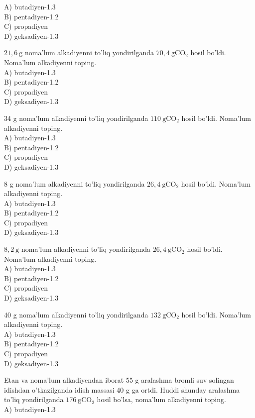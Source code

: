A) butadiyen-1.3\\
B) pentadiyen-1.2\\
C) propadiyen\\
D) geksadiyen-1.3
  \item $21,6 \mathrm{~g}$ noma'lum alkadiyenni to'liq yondirilganda $70,4 \mathrm{~g} \mathrm{CO}_{2}$ hosil bo'ldi. Noma'lum alkadiyenni toping.\\
A) butadiyen-1.3\\
B) pentadiyen-1.2\\
C) propadiyen\\
D) geksadiyen-1.3
  \item 34 g noma'lum alkadiyenni to'liq yondirilganda $110 \mathrm{~g} \mathrm{CO}_{2}$ hosil bo'ldi. Noma'lum alkadiyenni toping.\\
A) butadiyen-1.3\\
B) pentadiyen-1.2\\
C) propadiyen\\
D) geksadiyen-1.3
  \item 8 g noma'lum alkadiyenni to'liq yondirilganda $26,4 \mathrm{~g} \mathrm{CO}_{2}$ hosil bo'ldi. Noma'lum alkadiyenni toping.\\
A) butadiyen-1.3\\
B) pentadiyen-1.2\\
C) propadiyen\\
D) geksadiyen-1.3
  \item $8,2 \mathrm{~g}$ noma'lum alkadiyenni to'liq yondirilganda $26,4 \mathrm{~g} \mathrm{CO}_{2}$ hosil bo'ldi. Noma'lum alkadiyenni toping.\\
A) butadiyen-1.3\\
B) pentadiyen-1.2\\
C) propadiyen\\
D) geksadiyen-1.3
  \item 40 g noma'lum alkadiyenni to'liq yondirilganda $132 \mathrm{~g} \mathrm{CO}_{2}$ hosil bo'ldi. Noma'lum alkadiyenni toping.\\
A) butadiyen-1.3\\
B) pentadiyen-1.2\\
C) propadiyen\\
D) geksadiyen-1.3
  \item Etan va noma'lum alkadiyendan iborat 55 g aralashma bromli suv solingan idishdan o'tkazilganda idish massasi 40 g ga ortdi. Huddi shunday aralashma to'liq yondirilganda $176 \mathrm{~g} \mathrm{CO}_{2}$ hosil bo'lsa, noma'lum alkadiyenni toping.\\
A) butadiyen-1.3\\
